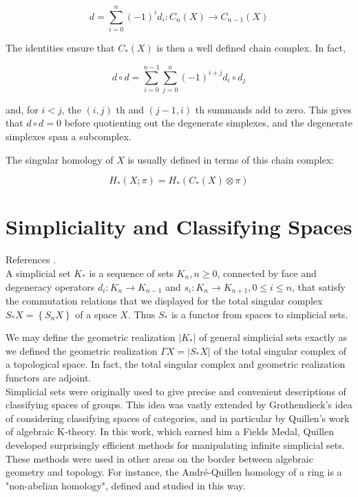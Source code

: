 $$
d=\sum_{i=0}^n(-1)^i d_i: C_n(X) \longrightarrow C_{n-1}(X)
$$


The identities ensure that $C_*(X)$ is then a well defined chain complex. In fact,

$$
d \circ d=\sum_{i=0}^{n-1} \sum_{j=0}^n(-1)^{i+j} d_i \circ d_j
$$

and, for $i<j$, the $(i, j)$ th and $(j-1, i)$ th summands add to zero. This gives that $d \circ d=0$ before quotienting out the degenerate simplexes, and the degenerate simplexes span a subcomplex.

The singular homology of $X$ is usually defined in terms of this chain complex:

$$
H_*(X ; \pi)=H_*\left(C_*(X) \otimes \pi\right)
$$









\chapter{Simpliciality and Classifying Spaces}
References \cite{richterCategoriesHomotopyTheory2020,goerssSimplicialHomotopyTheory2009,hatcherAlgebraicTopology2021,mayConciseCourseAlgebraic1999}. \\


A simplicial set $K_*$ is a sequence of sets $K_n, n \geq 0$, connected by face and degeneracy operators $d_i: K_n \longrightarrow K_{n-1}$ and $s_i: K_n \longrightarrow K_{n+1}, 0 \leq i \leq n$, that satisfy the commutation relations that we displayed for the total singular complex $S_* X=\left\{S_n X\right\}$ of a space $X$. Thus $S_*$ is a functor from spaces to simplicial sets.

We may define the geometric realization $\left|K_*\right|$ of general simplicial sets exactly as we defined the geometric realization $\Gamma X=\left|S_* X\right|$ of the total singular complex of a topological space. In fact, the total singular complex and geometric realization functors are adjoint.\\

Simplicial sets were originally used to give precise and convenient descriptions of classifying spaces of groups. This idea was vastly extended by Grothendieck's idea of considering classifying spaces of categories, and in particular by Quillen's work of algebraic K-theory. In this work, which earned him a Fields Medal, Quillen developed surprisingly efficient methods for manipulating infinite simplicial sets. These methods were used in other areas on the border between algebraic geometry and topology. For instance, the André-Quillen homology of a ring is a "non-abelian homology", defined and studied in this way.

